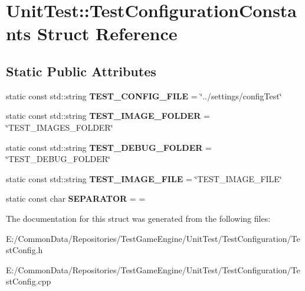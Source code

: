 \hypertarget{struct_unit_test_1_1_test_configuration_constants}{}\section{Unit\+Test\+::Test\+Configuration\+Constants Struct Reference}
\label{struct_unit_test_1_1_test_configuration_constants}
\subsection*{Static Public Attributes}
\begin{DoxyCompactItemize}
\item 
\mbox{\label{struct_unit_test_1_1_test_configuration_constants_ae33a2e2c70d34ce6a0871efd0475189b}} 
static const std\+::string {\bfseries T\+E\+S\+T\+\_\+\+C\+O\+N\+F\+I\+G\+\_\+\+F\+I\+LE} = \char`\"{}../settings/config\+Test\char`\"{}
\item 
\mbox{\label{struct_unit_test_1_1_test_configuration_constants_a44f27b246f1857daa5dfa9090f50d546}} 
static const std\+::string {\bfseries T\+E\+S\+T\+\_\+\+I\+M\+A\+G\+E\+\_\+\+F\+O\+L\+D\+ER} = \char`\"{}T\+E\+S\+T\+\_\+\+I\+M\+A\+G\+E\+S\+\_\+\+F\+O\+L\+D\+ER\char`\"{}
\item 
\mbox{\label{struct_unit_test_1_1_test_configuration_constants_adf9ebde8525f7d0acc3c1467199d3a66}} 
static const std\+::string {\bfseries T\+E\+S\+T\+\_\+\+D\+E\+B\+U\+G\+\_\+\+F\+O\+L\+D\+ER} = \char`\"{}T\+E\+S\+T\+\_\+\+D\+E\+B\+U\+G\+\_\+\+F\+O\+L\+D\+ER\char`\"{}
\item 
\mbox{\label{struct_unit_test_1_1_test_configuration_constants_a7e0716068872d0c1d02c6fe6154f1c0f}} 
static const std\+::string {\bfseries T\+E\+S\+T\+\_\+\+I\+M\+A\+G\+E\+\_\+\+F\+I\+LE} = \char`\"{}T\+E\+S\+T\+\_\+\+I\+M\+A\+G\+E\+\_\+\+F\+I\+LE\char`\"{}
\item 
\mbox{\label{struct_unit_test_1_1_test_configuration_constants_a9d8640cfff9fdbb13a93a758f3217a45}} 
static const char {\bfseries S\+E\+P\+A\+R\+A\+T\+OR} = \textquotesingle{}=\textquotesingle{}
\end{DoxyCompactItemize}


The documentation for this struct was generated from the following files\+:\begin{DoxyCompactItemize}
\item 
E\+:/\+Common\+Data/\+Repositories/\+Test\+Game\+Engine/\+Unit\+Test/\+Test\+Configuration/Test\+Config.\+h\item 
E\+:/\+Common\+Data/\+Repositories/\+Test\+Game\+Engine/\+Unit\+Test/\+Test\+Configuration/Test\+Config.\+cpp\end{DoxyCompactItemize}

